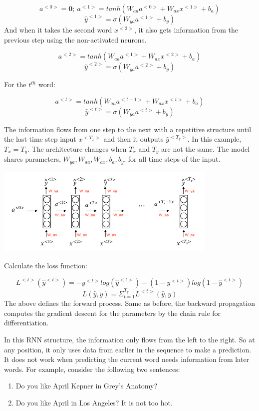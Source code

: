 \documentclass[12pt,]{krantz}
\providecommand{\tightlist}{%
  \setlength{\itemsep}{0pt}\setlength{\parskip}{0pt}}
\begin{document}
\[a^{<0>} = \mathbf{0};\ a^{<1>} = tanh(W_{aa}a^{<0>} + W_{ax}x^{<1>}+b_a)\]
\[\hat{y}^{<1>} = \sigma(W_{ya}a^{<1>}+b_y)\]
And when it takes the second word \(x^{<2>}\), it also gets information from the previous step using the non-activated neurons.

\[a^{<2>} = tanh(W_{aa}a^{<1>}+W_{ax}x^{<2>}+b_a)\]
\[\hat{y}^{<2>} = \sigma(W_{ya}a^{<2>}+b_y)\]

For the \(t^{th}\) word:

\[a^{<t>} = tanh(W_{aa}a^{<t-1>}+W_{ax}x^{<t>}+b_a)\]
\[\hat{y}^{<t>} = \sigma(W_{ya}a^{<t>}+b_y)\]

The information flows from one step to the next with a repetitive structure until the last time step input \(x^{<T_x>}\) and then it outputs \(\hat{y}^{<T_y>}\). In this example, \(T_x = T_y\). The architecture changes when \(T_x\) and \(T_y\) are not the same. The model shares parameters, \(W_{ya}, W_{aa}, W_{ax},b_a, b_y\), for all time steps of the input.

\includegraphics[width=0.8\textwidth,height=\textheight]{images/RNN_pro.png}

Calculate the loss function:

\[L^{<t>}(\hat{y}^{<t>}) = -y^{<t>}log(\hat{y}^{<t>})-(1-y^{<t>})log(1-\hat{y}^{<t>})\]
\[L(\hat{y},y)=\Sigma_{t=1}^{T_y}L^{<t>}(\hat{y},y)\]
The above defines the forward process. Same as before, the backward propagation computes the gradient descent for the parameters by the chain rule for differentiation.

In this RNN structure, the information only flows from the left to the right. So at any position, it only uses data from earlier in the sequence to make a prediction. It does not work when predicting the current word needs information from later words. For example, consider the following two sentences:

\begin{enumerate}
\def\labelenumi{\arabic{enumi}.}
\tightlist
\item
  Do you like April Kepner in Grey's Anatomy?
\item
  Do you like April in Los Angeles? It is not too hot.
\end{enumerate}
\end{document}
